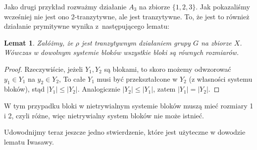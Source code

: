 \documentclass[licencjacka]{pracamgr}
\newtheorem{lemma}{Lemat}[section]
\begin{document}
Jako drugi przykład rozważmy działanie $A_3$ na zbiorze $\{1, 2, 3\}$.
Jak pokazaliśmy wcześniej nie jest ono 2-tranzytywne, ale jest tranzytywne.
To, że jest to również działanie prymitywne wynika z~następującego lematu:

\begin{lemma}
	Załóżmy, że $\rho$ jest tranzytywnym działaniem grupy $G$ na zbiorze $X$.
	Wówczas w dowolnym systemie bloków wszystkie bloki są równych rozmiarów.
\end{lemma}
\begin{proof}
Rzeczywiście, jeżeli $Y_1, Y_2$ są blokami, to skoro możemy odwzorować $y_1 \in Y_1$ na $y_2 \in Y_2$, 
To całe $Y_1$ musi być przekształcone w $Y_2$ (z własności systemu bloków), stąd $|Y_1| \le |Y_2|$.
Analogicznie $|Y_2| \le |Y_1|$, zatem $|Y_1| = |Y_2|$.
\end{proof}


W tym przypadku bloki w nietrywialnym systemie bloków muszą mieć rozmiary 1 i 2,
czyli różne, więc nietrywialny system bloków nie może istnieć.

Udowodnijmy teraz jeszcze jedno stwierdzenie, które jest użyteczne w dowodzie lematu Iwasawy.
\end{document}
